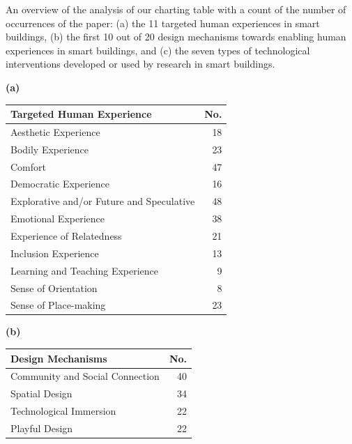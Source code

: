 \begin{maintable}[tbp]
\centering
\caption{An overview of the analysis of our charting table with a count of the number of occurrences of the paper: (a) the 11 targeted human experiences in smart buildings, (b) the first 10 out of 20 design mechanisms towards enabling human experiences in smart buildings, and (c) the seven types of technological interventions developed or used by research in smart buildings.}
\label{tab:bigoverview}

\fontsize{7.2}{8.5}\selectfont
\setlength{\tabcolsep}{2.2pt}
\renewcommand{\arraystretch}{1.03}

\noindent
\begin{minipage}[t]{.31\linewidth}
\centering
\textbf{(a)}\par\vspace{.25\baselineskip}
\begin{tabularx}{\linewidth}{@{}Y r@{}}
\toprule
Targeted Human Experience & No. \\
\midrule
Aesthetic Experience & 18 \\
Bodily Experience & 23 \\
Comfort & 47 \\
Democratic Experience & 16 \\
Explorative and/or Future and Speculative & 48 \\
Emotional Experience & 38 \\
Experience of Relatedness & 21 \\
Inclusion Experience & 13 \\
Learning and Teaching Experience & 9 \\
Sense of Orientation & 8 \\
Sense of Place-making & 23 \\
\bottomrule
\end{tabularx}
\end{minipage}%
\hfill
\begin{minipage}[t]{.31\linewidth}
\centering
\textbf{(b)}\par\vspace{.25\baselineskip}
\begin{tabularx}{\linewidth}{@{}Y r@{}}
\toprule
Design Mechanisms & No. \\
\midrule
Community and Social Connection & 40 \\
Spatial Design & 34 \\
Technological Immersion & 22 \\
Playful Design & 22 \\

\end{tabularx}
\end{minipage}
\end{maintable}
